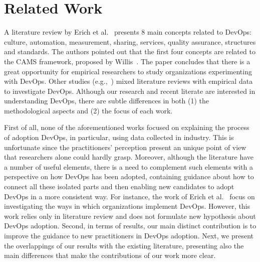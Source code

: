 \section{Related Work} \label{sec:related_work}

A literature review by Erich et al.~\cite{cooperation_dev_ops_esem_2014} presents 8
main concepts related to DevOps: culture, automation, measurement, sharing,
services, quality assurance, structures and standards. The authors pointed out
that the first four concepts are
related to the CAMS framework, proposed by Willis~\cite{what_devops_means_2010}.
The paper concludes that there is a great opportunity for empirical researchers
to study organizations experimenting with DevOps.
Other studies (e.g.,~\cite{devops_a_definition_xp_15,dimensions_of_devops_xp_15,extending_dimensions_icsea_16,characterizing_devops_sbes_2016,qualitative_devops_journalsw_17})
mixed literature reviews with empirical data to investigate DevOps.
Although our research and recent literate are interested in understanding DevOps,
there are subtle differences in both (1) the methodological aspects and (2) the focus
of each work.

First of all, none of the aforementioned works focused on explaining the process of adoption DevOps,
in particular, using data collected in industry. This is unfortunate since the
practitioners' perception present an unique point of view that researchers
alone could hardly grasp. Moreover, although the literature have a number of
useful elements, there is a need to complement such elements with a perspective on how DevOps has
been adopted, containing guidance about how to connect all these isolated parts
and then enabling new candidates to adopt DevOps in a more consistent way.
For instance, the work of Erich et al.~\cite{qualitative_devops_journalsw_17}
focus on investigating the ways in which organizations implement DevOps.
However, this work relies only in literature review and does not formulate
new hypothesis about DevOps adoption. Second,
in terms of results, our main distinct contribution is to improve the guidance
to new practitioners in DevOps adoption.
Next, we present the overlappings of our
results with the existing literature, presenting also the main differences that
make the contributions of our work more clear.

